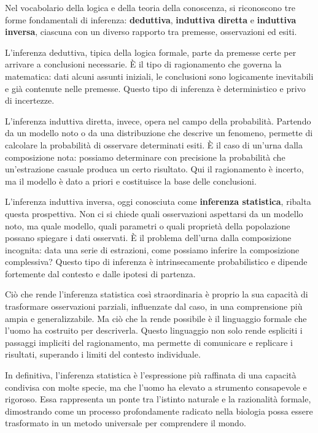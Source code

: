 \documentclass[
  11pt,
]{book}
\theoremstyle{mytheoremstyle}
\theoremstyle{mydefstyle}
\begin{document}
Nel vocabolario della logica e della teoria della conoscenza, si riconoscono tre forme fondamentali di inferenza: \textbf{deduttiva}, \textbf{induttiva diretta} e \textbf{induttiva inversa}, ciascuna con un diverso rapporto tra premesse, osservazioni ed esiti.

L'inferenza deduttiva, tipica della logica formale, parte da premesse certe per arrivare a conclusioni necessarie. È il tipo di ragionamento che governa la matematica: dati alcuni assunti iniziali, le conclusioni sono logicamente inevitabili e già contenute nelle premesse. Questo tipo di inferenza è deterministico e privo di incertezze.

L'inferenza induttiva diretta, invece, opera nel campo della probabilità. Partendo da un modello noto o da una distribuzione che descrive un fenomeno, permette di calcolare la probabilità di osservare determinati esiti. È il caso di un'urna dalla composizione nota: possiamo determinare con precisione la probabilità che un'estrazione casuale produca un certo risultato. Qui il ragionamento è incerto, ma il modello è dato a priori e costituisce la base delle conclusioni.

L'inferenza induttiva inversa, oggi conosciuta come \textbf{inferenza statistica}, ribalta questa prospettiva. Non ci si chiede quali osservazioni aspettarsi da un modello noto, ma quale modello, quali parametri o quali proprietà della popolazione possano spiegare i dati osservati. È il problema dell'urna dalla composizione incognita: data una serie di estrazioni, come possiamo inferire la composizione complessiva? Questo tipo di inferenza è intrinsecamente probabilistico e dipende fortemente dal contesto e dalle ipotesi di partenza.

Ciò che rende l'inferenza statistica così straordinaria è proprio la sua capacità di trasformare osservazioni parziali, influenzate dal caso, in una comprensione più ampia e generalizzabile. Ma ciò che la rende possibile è il linguaggio formale che l'uomo ha costruito per descriverla. Questo linguaggio non solo rende espliciti i passaggi impliciti del ragionamento, ma permette di comunicare e replicare i risultati, superando i limiti del contesto individuale.

In definitiva, l'inferenza statistica è l'espressione più raffinata di una capacità condivisa con molte specie, ma che l'uomo ha elevato a strumento consapevole e rigoroso. Essa rappresenta un ponte tra l'istinto naturale e la razionalità formale, dimostrando come un processo profondamente radicato nella biologia possa essere trasformato in un metodo universale per comprendere il mondo.
\end{document}
